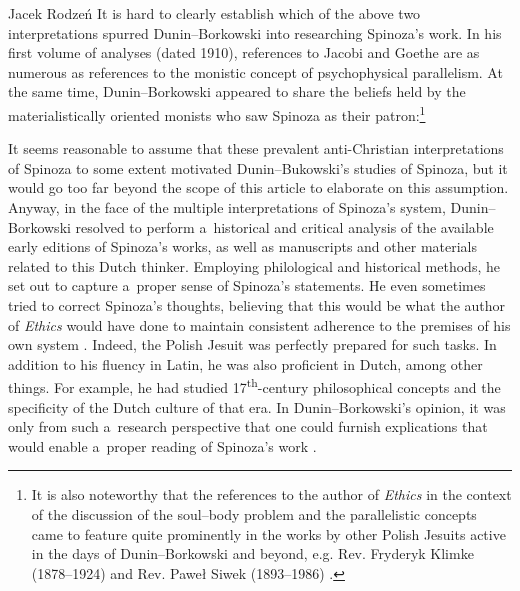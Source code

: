 \begin{artengenv}{Jacek Rodzeń}
It is hard to clearly establish which of the above two interpretations spurred Dunin–Borkowski into researching Spinoza's work. In his first volume of analyses (dated 1910), references to Jacobi and Goethe are as numerous as references to the monistic concept of psychophysical parallelism. At the same time, Dunin–Borkowski appeared to share the beliefs held by the materialistically oriented monists who saw Spinoza as their patron:\footnote{It is also noteworthy that the references to the author of \textit{Ethics} in the context of the discussion of the soul--body problem and the parallelistic concepts came to feature quite prominently in the works by other Polish Jesuits active in the days of Dunin--Borkowski and beyond, e.g. Rev. Fryderyk Klimke (1878--1924) and Rev. Paweł Siwek (1893--1986)
\parencites*[cf.][pp.6]{klimke_teorya_1906}[][pp.312–332]{klimke_monismus_1911}[][pp.1310–1314]{bremer_philosophy_2020}.%
}


It seems reasonable to assume that these prevalent anti-Christian interpretations of Spinoza to some extent motivated Dunin–Bukowski's studies of Spinoza, but it would go too far beyond the scope of this article to elaborate on this assumption. Anyway, in the face of the multiple interpretations of Spinoza's system, Dunin–Borkowski resolved to perform a~historical and critical analysis of the available early editions of Spinoza's works, as well as manuscripts and other materials related to this Dutch thinker. Employing philological and historical methods, he set out to capture a~proper sense of Spinoza's statements. He even sometimes tried to correct Spinoza's thoughts, believing that this would be what the author of \textit{Ethics} would have done to maintain consistent adherence to the premises of his own system
\parencite[][p.308]{siwek_spinoza_1938}. %
 Indeed, the Polish Jesuit was perfectly prepared for such tasks. In addition to his fluency in Latin, he was also proficient in Dutch, among other things. For example, he had studied 17\textsuperscript{th}-century philosophical concepts and the specificity of the Dutch culture of that era. In Dunin–Borkowski's opinion, it was only from such a~research perspective that one could furnish explications that would enable a~proper reading of Spinoza's work 
\parencite[][p.XI–XXIII]{dunin-borkowski_junge_1910}.%



\end{artengenv}
